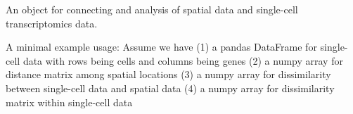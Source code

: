 \documentclass[letterpaper,10pt,english]{sphinxmanual}
\begin{document}
\begin{fulllineitems}
\label{\detokenize{api:spaotsc.SpaOTsc.spatial_sc}}
An object for connecting and analysis of spatial data and single-cell transcriptomics data.

A minimal example usage:
Assume we have (1) a pandas DataFrame for single-cell data  with rows being cells and columns being genes
(2) a numpy array for distance matrix among spatial locations 
(3) a numpy array for dissimilarity between single-cell data and spatial data 
(4) a numpy array for dissimilarity matrix within single-cell data 


\end{fulllineitems}
\end{document}
